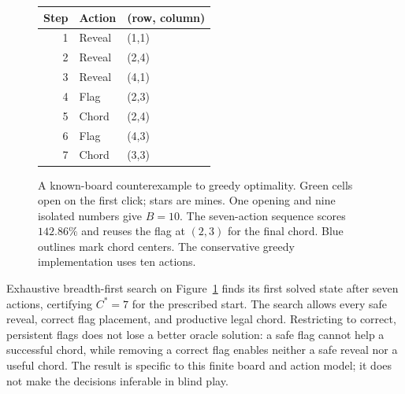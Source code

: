 \documentclass[11pt,letterpaper]{article}
\begin{document}
\begin{figure}[tb]
\centering
\begin{minipage}[c]{0.43\linewidth}\centering
{}
\end{minipage}\hfill
\begin{minipage}[c]{0.53\linewidth}\small
\begin{tabular}{rll}
\toprule
Step & Action & (row, column)\\
\midrule
1 & Reveal & (1,1)\\
2 & Reveal & (2,4)\\
3 & Reveal & (4,1)\\
4 & Flag & (2,3)\\
5 & Chord & (2,4)\\
6 & Flag & (4,3)\\
7 & Chord & (3,3)\\
\bottomrule
\end{tabular}
\end{minipage}
\caption{A known-board counterexample to greedy optimality. Green cells open on the first click; stars are mines. One opening and nine isolated numbers give $B=10$. The seven-action sequence scores $142.86\%$ and reuses the flag at $(2,3)$ for the final chord. Blue outlines mark chord centers. The conservative greedy implementation uses ten actions.}
\label{fig:exact}
\end{figure}

Exhaustive breadth-first search on Figure~\ref{fig:exact} finds its first solved state after seven actions, certifying $C^*=7$ for the prescribed start. The search allows every safe reveal, correct flag placement, and productive legal chord. Restricting to correct, persistent flags does not lose a better oracle solution: a safe flag cannot help a successful chord, while removing a correct flag enables neither a safe reveal nor a useful chord. The result is specific to this finite board and action model; it does not make the decisions inferable in blind play.
\end{document}
